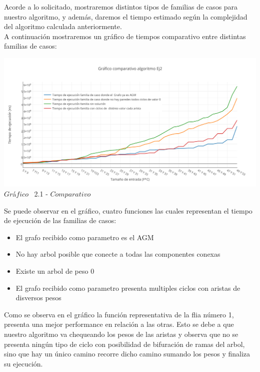 \indent Acorde a lo solicitado, mostraremos distintos tipos de familias de casos para nuestro algoritmo, y adem\'as, daremos el tiempo estimado 
seg\'un la complejidad del algoritmo calculada anteriormente.\\

A continuaci\'on mostraremos un gr\'afico de tiempos comparativo entre distintas familias de casos:\\ 

\vspace*{0.3cm} \vspace*{0.3cm}
  \begin{center}
 \includegraphics[scale=0.65]{./EJ2/comparativo.png}
 {$Gr$\'a$fico$ \ 2.1 - $Comparativo$}
  \end{center}
  \vspace*{0.3cm}
  
Se puede observar en el gr\'afico, cuatro funciones las cuales representan el tiempo de ejecuci\'on de las familias de casos:\\
\begin{itemize}
\item El grafo recibido como parametro es el AGM
\item No hay arbol posible que conecte a todas las componentes conexas
\item Existe un arbol de peso 0
\item El grafo recibido como parametro presenta multiples ciclos con aristas de disversos pesos
\end{itemize}

Como se observa en el gr\'afico la funci\'on representativa de la flia n\'umero 1, presenta una mejor performance en relaci\'on a las otras. Esto se debe a que nuestro algoritmo va chequeando los pesos de las aristas y observa que no se presenta ning\'un tipo de ciclo con posibilidad de bifuraci\'on de ramas del arbol, sino que hay un \'unico camino recorre dicho camino sumando los pesos y finaliza su ejecuci\'on.


